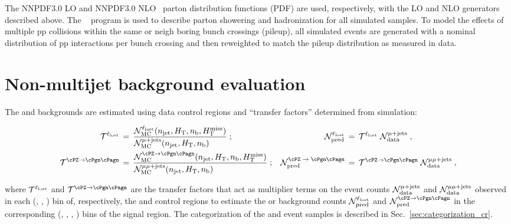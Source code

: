 The \textsc{NNPDF}3.0 LO and \textsc{NNPDF}3.0 NLO~\cite{nnpdf} parton
distribution functions (PDF) are used, respectively, with the LO and
NLO generators described above. The ~\cite{pythia} program
is used to describe parton showering and hadronization for all
simulated samples. To model the effects of multiple pp collisions
within the same or neigh boring bunch crossings (pileup), all simulated
events are generated with a nominal distribution of pp interactions
per bunch crossing and then reweighted to match the pileup
distribution as measured in data.


\clearpage
\section{Non-multijet background evaluation}
\label{sec:ewk}

The \lost and \znunuj backgrounds are estimated using data control
regions and ``transfer factors'' determined from simulation: 

\begin{align}
  \tf^{\lost} \, & = \,
  \frac{\mathcal{N}^{\lost}_\textrm{MC}(\njet, \scalht, \nb, \mht)}
  {\mathcal{N}^{\mj}_\textrm{MC}(\njet, \scalht, \nb)\hfill} \; ;
  & 
  \mathcal{N}^{\lost}_\textrm{pred} \, & = \,
  \tf^{\lost} \; \mathcal{N}^{\mj}_\textrm{data} \; ,
  \\
  \tf^{\znunu} \, & = \,
  \frac{\mathcal{N}^{\znunu}_\textrm{MC}(\njet, \scalht, \nb, \mht)}
  {\mathcal{N}^{\mmj}_\textrm{MC}(\njet, \scalht, \nb)\hfill} \; ;
  & 
  \mathcal{N}^\textrm{\znunu}_\textrm{pred} \, & = \,
  \tf^{\znunu} \; \mathcal{N}^{\mmj}_\textrm{data} \; ,
\end{align}

where $\mathcal{T}^{\ell_\textrm{lost}}$ and $\tf^{\znunu}$ are the transfer factors that
act as multiplier terms on the event counts
$\mathcal{N}^{\mu + \text{jets}}_\textrm{data}$ and
$\mathcal{N}^{\mu\mu + \text{jets}}_\textrm{data}$ observed in each (\njet, \scalht,
\nb) bin of, respectively, the \mj and \mmj control regions to
estimate the \lost or \znunuj background counts
$\mathcal{N}^{\ell_\textrm{lost}}_\textrm{pred}$ and
$\mathcal{N}^{\znunu}_\textrm{pred}$ in the corresponding (\njet,
\scalht, \nb, \mht) bins of the signal region. The categorization of
the \mj and \mmj event samples is described in
Sec.~\ref{sec:categorization_cr}.

